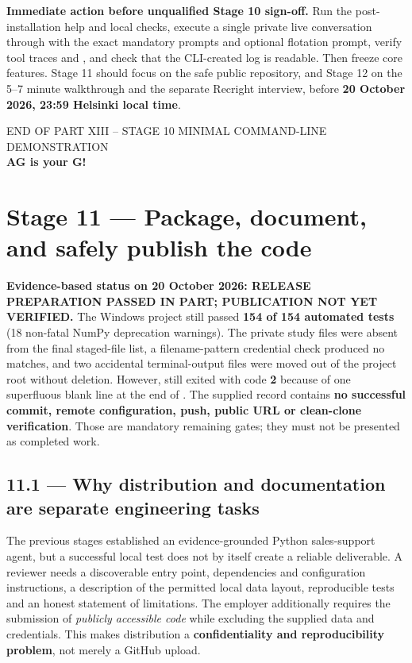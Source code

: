 \documentclass[11pt,a4paper]{article}
\DeclareRobustCommand{\code}[1]{{\ttfamily\small\detokenize{#1}}}
\begin{document}
\textbf{Immediate action before unqualified Stage 10 sign-off.} Run the post-installation help and local checks, execute a single private live conversation through \code{main.py} with the exact mandatory prompts and optional flotation prompt, verify tool traces and \code{exit}, and check that the CLI-created log is readable. Then freeze core features. Stage 11 should focus on the safe public repository, and Stage 12 on the 5--7 minute walkthrough and the separate Recright interview, before \textbf{20 October 2026, 23:59 Helsinki local time}.

\vspace{1mm}
\begin{center}
{\sffamily\color{Gray}\footnotesize END OF PART XIII -- STAGE 10 MINIMAL COMMAND-LINE DEMONSTRATION}\\[2mm]
{\sffamily\bfseries\color{Navy}AG is your G!}
\end{center}

\clearpage
\section{Stage 11 --- Package, document, and safely publish the code}
\begin{warnbox}
\textbf{Evidence-based status on 20 October 2026: RELEASE PREPARATION PASSED IN PART; PUBLICATION NOT YET VERIFIED.} The Windows project still passed \textbf{154 of 154 automated tests} (18 non-fatal NumPy deprecation warnings). The private study files were absent from the final staged-file list, a filename-pattern credential check produced no matches, and two accidental terminal-output files were moved out of the project root without deletion. However, \code{git diff --cached --check} still exited with code \textbf{2} because of one superfluous blank line at the end of \code{.gitignore}. The supplied record contains \textbf{no successful commit, remote configuration, push, public URL or clean-clone verification}. Those are mandatory remaining gates; they must not be presented as completed work.
\end{warnbox}

\subsection{11.1 --- Why distribution and documentation are separate engineering tasks}
The previous stages established an evidence-grounded Python sales-support agent, but a successful local test does not by itself create a reliable deliverable. A reviewer needs a discoverable entry point, dependencies and configuration instructions, a description of the permitted local data layout, reproducible tests and an honest statement of limitations. The employer additionally requires the submission of \emph{publicly accessible code} while excluding the supplied data and credentials. This makes distribution a \textbf{confidentiality and reproducibility problem}, not merely a GitHub upload.
\end{document}
